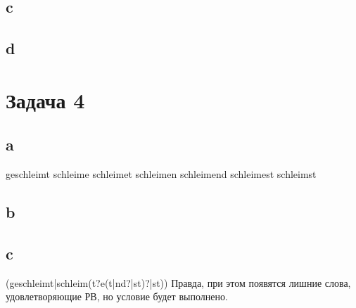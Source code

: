 \documentclass[12pt]{article}
\begin{document}
\subsection{c}
{}
\subsection{d}
{}

\section{Задача 4}
{}
\subsection{a}
geschleimt
schleime
schleimet
schleimen
schleimend
schleimest
schleimst
\subsection{b}
\subsection{c}
{\ttfamily (geschleimt|schleim(t?e(t|nd?|st)?|st))}
Правда, при этом появятся лишние слова, удовлетворяющие РВ, но условие будет выполнено.


\newcommand\Too[1]{&\xrightarrow[]{#1}}
\end{document}
